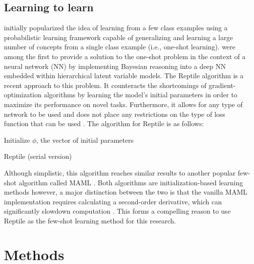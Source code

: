 \documentclass[a4paper]{book}
\begin{document}
\section{Learning to learn} \label{sec:learn2learn}

\textcite{lake_human-level_2015} initially popularized the idea of learning from a few class examples using a probabilistic learning framework capable of generalizing and learning a large number of concepts from a single class example (i.e., one-shot learning). \textcite{rezende_one-shot_2016} were among the first to provide a solution to the one-shot problem in the context of a neural network (NN) by implementing Bayesian reasoning into a deep NN embedded within hierarchical latent variable models. The Reptile algorithm \parencite{nichol_first-order_2018} is a recent approach to this problem. It counteracts the shortcomings of gradient-optimization algorithms by learning the model's initial parameters in order to maximize its performance on novel tasks. Furthermore, it allows for any type of network to be used and does not place any restrictions on the type of loss function that can be used \parencite{nichol_first-order_2018}. The algorithm for Reptile is as follows:

\IncMargin{1em}
\begin{algorithm}
Initialize $\phi$, the vector of initial parameters


\caption{Reptile (serial version)}
\label{alg:reptile}
\end{algorithm}
\DecMargin{1em}

Although simplistic, this algorithm reaches similar results to another popular few-shot algorithm called MAML \parencite{finn_model-agnostic_2017}. Both algorithms are initialization-based learning methods however, a major distinction between the two is that the vanilla MAML implementation requires calculating a second-order derivative, which can significantly slowdown computation \parencite{nichol_first-order_2018}. This forms a compelling reason to use Reptile as the few-shot learning method for this research.

\chapter{Methods}\label{chap:methods}
\end{document}
